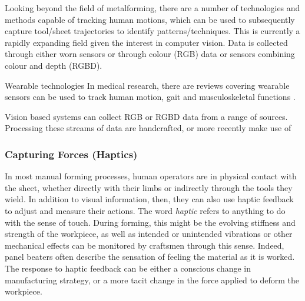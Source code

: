 Looking beyond the field of metalforming, there are a number of technologies and methods capable of tracking human motions, which can be used to subsequently capture tool/sheet trajectories to identify patterns/techniques. This is currently a rapidly expanding field given the interest in computer vision. Data is collected through either worn sensors or through colour (RGB) data or sensors combining colour and depth (RGBD).  

Wearable technologies
In medical research, there are reviews covering wearable sensors can be used to track human motion, gait and musculoskeletal functions \citep{Homayounfar2020WearableChallenges}.

Vision based systems can collect RGB or RGBD data from a range of sources. Processing these streams of data
are handcrafted, or more recently make use of 




\subsubsection{Capturing Forces (Haptics)}
In most manual forming processes, human operators are in physical contact with the sheet, whether directly with their limbs or indirectly through the tools they wield. In addition to visual information, then, they can also use haptic feedback to adjust and measure their actions. The word \textit{haptic} refers to anything to do with the sense of touch. During forming, this might be the evolving stiffness and strength of the workpiece, as well as intended or unintended vibrations or other mechanical effects can be monitored by craftsmen through this sense. Indeed, panel beaters often describe the sensation of feeling the material as it is worked. The response to haptic feedback can be either a conscious change in manufacturing strategy, or a more tacit change in the force applied to deform the workpiece. 

